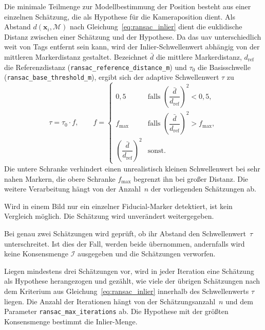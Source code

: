 Die minimale Teilmenge zur Modellbestimmung der Position besteht aus einer einzelnen Schätzung, die als Hypothese für die Kameraposition dient.
Als Abstand $d(\mathbf{x}_i, \mathcal{M})$ nach Gleichung~\ref{eq:ransac_inlier} dient die euklidische Distanz zwischen einer Schätzung und der Hypothese.
Da das \gls{uav} unterschiedlich weit von Tags entfernt sein kann, wird der Inlier-Schwellenwert abhängig von der mittleren Markerdistanz gestaltet.
Bezeichnet $\bar{d}$ die mittlere Markerdistanz, $d_{\mathrm{ref}}$ die Referenzdistanz (\texttt{ransac\_reference\_\-distance\_m})
und $\tau_0$ die Basisschwelle (\texttt{ransac\_base\_\-threshold\_m}), ergibt sich der adaptive Schwellenwert $\tau$ zu
\begin{equation}
\tau = \tau_0 \cdot f, \qquad
f =
\begin{cases}
0{,}5 & \text{falls } \left(\dfrac{\bar{d}}{d_{\mathrm{ref}}}\right)^{2} < 0{,}5, \\[2ex]



f_{\max} & \text{falls } \left(\dfrac{\bar{d}}{d_{\mathrm{ref}}}\right)^{2} > f_{\max}, \\[2ex]
\left(\dfrac{\bar{d}}{d_{\mathrm{ref}}}\right)^{2} & \text{sonst.}
\end{cases}
\label{eq:pos_ransac_schwelle}
\end{equation}
Die untere Schranke verhindert einen unrealistisch kleinen Schwellenwert bei sehr nahen Markern, 
die obere Schranke $f_{\max}$ begrenzt ihn bei großer Distanz.
Die weitere Verarbeitung hängt von der Anzahl~$n$ der vorliegenden Schätzungen ab.

Wird in einem Bild nur ein einzelner Fiducial-Marker detektiert, ist kein Vergleich möglich. 
Die Schätzung wird unverändert weitergegeben.

Bei genau zwei Schätzungen wird geprüft, ob ihr Abstand den Schwellenwert~$\tau$ unterschreitet. 
Ist dies der Fall, werden beide übernommen, andernfalls wird keine Konsensmenge $\mathcal{I}$ ausgegeben und die Schätzungen verworfen.

Liegen mindestens drei Schätzungen vor, wird in jeder Iteration eine Schätzung als Hypothese herangezogen und gezählt, 
wie viele der übrigen Schätzungen nach dem Kriterium aus Gleichung~\ref{eq:ransac_inlier} innerhalb des Schwellenwerts $\tau$ liegen.
Die Anzahl der Iterationen hängt von der Schätzungsanzahl~$n$ und dem Parameter \texttt{ransac\_max\_iterations} ab.
Die Hypothese mit der größten Konsensmenge bestimmt die Inlier-Menge.

